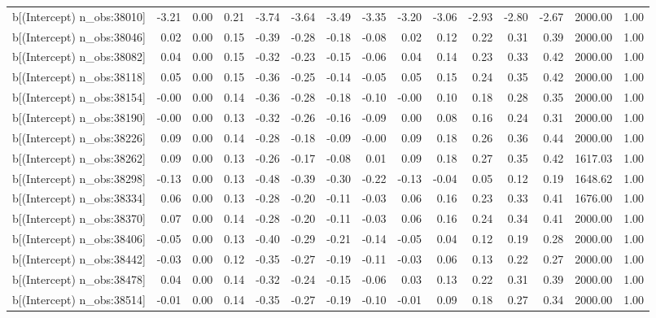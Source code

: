 \begin{table}[ht]
\begin{tabular}{rrrrrrrrrrrrrrr}
  b[(Intercept) n\_obs:38010] & -3.21 & 0.00 & 0.21 & -3.74 & -3.64 & -3.49 & -3.35 & -3.20 & -3.06 & -2.93 & -2.80 & -2.67 & 2000.00 & 1.00 \\ 
  b[(Intercept) n\_obs:38046] & 0.02 & 0.00 & 0.15 & -0.39 & -0.28 & -0.18 & -0.08 & 0.02 & 0.12 & 0.22 & 0.31 & 0.39 & 2000.00 & 1.00 \\ 
  b[(Intercept) n\_obs:38082] & 0.04 & 0.00 & 0.15 & -0.32 & -0.23 & -0.15 & -0.06 & 0.04 & 0.14 & 0.23 & 0.33 & 0.42 & 2000.00 & 1.00 \\ 
  b[(Intercept) n\_obs:38118] & 0.05 & 0.00 & 0.15 & -0.36 & -0.25 & -0.14 & -0.05 & 0.05 & 0.15 & 0.24 & 0.35 & 0.42 & 2000.00 & 1.00 \\ 
  b[(Intercept) n\_obs:38154] & -0.00 & 0.00 & 0.14 & -0.36 & -0.28 & -0.18 & -0.10 & -0.00 & 0.10 & 0.18 & 0.28 & 0.35 & 2000.00 & 1.00 \\ 
  b[(Intercept) n\_obs:38190] & -0.00 & 0.00 & 0.13 & -0.32 & -0.26 & -0.16 & -0.09 & 0.00 & 0.08 & 0.16 & 0.24 & 0.31 & 2000.00 & 1.00 \\ 
  b[(Intercept) n\_obs:38226] & 0.09 & 0.00 & 0.14 & -0.28 & -0.18 & -0.09 & -0.00 & 0.09 & 0.18 & 0.26 & 0.36 & 0.44 & 2000.00 & 1.00 \\ 
  b[(Intercept) n\_obs:38262] & 0.09 & 0.00 & 0.13 & -0.26 & -0.17 & -0.08 & 0.01 & 0.09 & 0.18 & 0.27 & 0.35 & 0.42 & 1617.03 & 1.00 \\ 
  b[(Intercept) n\_obs:38298] & -0.13 & 0.00 & 0.13 & -0.48 & -0.39 & -0.30 & -0.22 & -0.13 & -0.04 & 0.05 & 0.12 & 0.19 & 1648.62 & 1.00 \\ 
  b[(Intercept) n\_obs:38334] & 0.06 & 0.00 & 0.13 & -0.28 & -0.20 & -0.11 & -0.03 & 0.06 & 0.16 & 0.23 & 0.33 & 0.41 & 1676.00 & 1.00 \\ 
  b[(Intercept) n\_obs:38370] & 0.07 & 0.00 & 0.14 & -0.28 & -0.20 & -0.11 & -0.03 & 0.06 & 0.16 & 0.24 & 0.34 & 0.41 & 2000.00 & 1.00 \\ 
  b[(Intercept) n\_obs:38406] & -0.05 & 0.00 & 0.13 & -0.40 & -0.29 & -0.21 & -0.14 & -0.05 & 0.04 & 0.12 & 0.19 & 0.28 & 2000.00 & 1.00 \\ 
  b[(Intercept) n\_obs:38442] & -0.03 & 0.00 & 0.12 & -0.35 & -0.27 & -0.19 & -0.11 & -0.03 & 0.06 & 0.13 & 0.22 & 0.27 & 2000.00 & 1.00 \\ 
  b[(Intercept) n\_obs:38478] & 0.04 & 0.00 & 0.14 & -0.32 & -0.24 & -0.15 & -0.06 & 0.03 & 0.13 & 0.22 & 0.31 & 0.39 & 2000.00 & 1.00 \\ 
  b[(Intercept) n\_obs:38514] & -0.01 & 0.00 & 0.14 & -0.35 & -0.27 & -0.19 & -0.10 & -0.01 & 0.09 & 0.18 & 0.27 & 0.34 & 2000.00 & 1.00 \\ 

\end{tabular}
\end{table}
